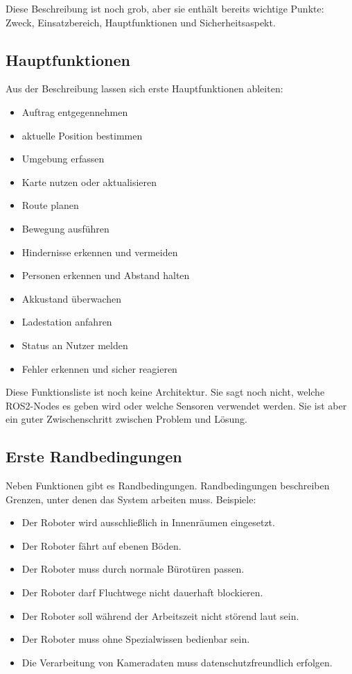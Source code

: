 Diese Beschreibung ist noch grob, aber sie enthält bereits wichtige Punkte: Zweck, Einsatzbereich, Hauptfunktionen und Sicherheitsaspekt.

\subsection{Hauptfunktionen}
Aus der Beschreibung lassen sich erste Hauptfunktionen ableiten:

\begin{itemize}
    \item Auftrag entgegennehmen
    \item aktuelle Position bestimmen
    \item Umgebung erfassen
    \item Karte nutzen oder aktualisieren
    \item Route planen
    \item Bewegung ausführen
    \item Hindernisse erkennen und vermeiden
    \item Personen erkennen und Abstand halten
    \item Akkustand überwachen
    \item Ladestation anfahren
    \item Status an Nutzer melden
    \item Fehler erkennen und sicher reagieren
\end{itemize}

Diese Funktionsliste ist noch keine Architektur. Sie sagt noch nicht, welche ROS2-Nodes es geben wird oder welche Sensoren verwendet werden. Sie ist aber ein guter Zwischenschritt zwischen Problem und Lösung.

\subsection{Erste Randbedingungen}
Neben Funktionen gibt es Randbedingungen. Randbedingungen beschreiben Grenzen, unter denen das System arbeiten muss. Beispiele:

\begin{itemize}
    \item Der Roboter wird ausschließlich in Innenräumen eingesetzt.
    \item Der Roboter fährt auf ebenen Böden.
    \item Der Roboter muss durch normale Bürotüren passen.
    \item Der Roboter darf Fluchtwege nicht dauerhaft blockieren.
    \item Der Roboter soll während der Arbeitszeit nicht störend laut sein.
    \item Der Roboter muss ohne Spezialwissen bedienbar sein.
    \item Die Verarbeitung von Kameradaten muss datenschutzfreundlich erfolgen.
\end{itemize}

